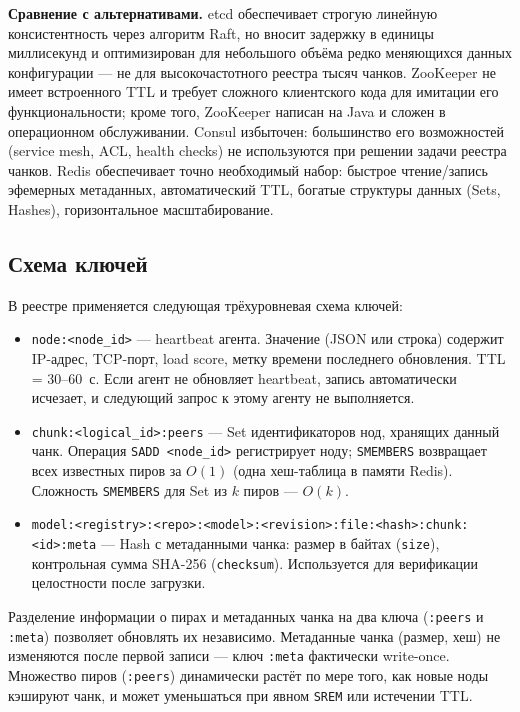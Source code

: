 \textbf{Сравнение с альтернативами.} etcd обеспечивает строгую линейную консистентность через алгоритм Raft, но вносит задержку в единицы миллисекунд и оптимизирован для небольшого объёма редко меняющихся данных конфигурации --- не для высокочастотного реестра тысяч чанков. ZooKeeper не имеет встроенного TTL и требует сложного клиентского кода для имитации его функциональности; кроме того, ZooKeeper написан на Java и сложен в операционном обслуживании. Consul избыточен: большинство его возможностей (service mesh, ACL, health checks) не используются при решении задачи реестра чанков. Redis обеспечивает точно необходимый набор: быстрое чтение/запись эфемерных метаданных, автоматический TTL, богатые структуры данных (Sets, Hashes), горизонтальное масштабирование.

\subsection*{Схема ключей}

В реестре применяется следующая трёхуровневая схема ключей:

\begin{itemize}[leftmargin=*]
  \item \texttt{node:<node\_id>} --- heartbeat агента. Значение (JSON или строка) содержит IP-адрес, TCP-порт, load score, метку времени последнего обновления. TTL = 30--60~с. Если агент не обновляет heartbeat, запись автоматически исчезает, и следующий запрос к этому агенту не выполняется.
  \item \texttt{chunk:<logical\_id>:peers} --- Set идентификаторов нод, хранящих данный чанк. Операция \texttt{SADD <node\_id>} регистрирует ноду; \texttt{SMEMBERS} возвращает всех известных пиров за $O(1)$ (одна хеш-таблица в памяти Redis). Сложность \texttt{SMEMBERS} для Set из $k$ пиров --- $O(k)$.
  \item {\small\texttt{model:<registry>:<repo>:<model>:<revision>:file:<hash>:chunk:<id>:meta}} --- Hash с метаданными чанка: размер в байтах (\texttt{size}), контрольная сумма SHA-256 (\texttt{checksum}). Используется для верификации целостности после загрузки.
\end{itemize}

Разделение информации о пирах и метаданных чанка на два ключа (\texttt{:peers} и \texttt{:meta}) позволяет обновлять их независимо. Метаданные чанка (размер, хеш) не изменяются после первой записи --- ключ \texttt{:meta} фактически write-once. Множество пиров (\texttt{:peers}) динамически растёт по мере того, как новые ноды кэшируют чанк, и может уменьшаться при явном \texttt{SREM} или истечении TTL.

